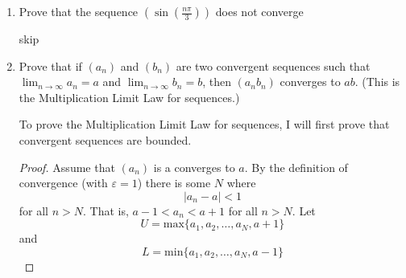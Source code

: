 \documentclass[11pt]{exam}
\begin{document}
    \begin{enumerate}
        \item Prove that the sequence $(\sin(\frac{n\pi}{3}))$ does not converge
            \begin{solution}
                skip
            \end{solution}

        \item Prove that if $(a_n)$ and $(b_n)$ are two convergent sequences such that $\lim_{n \to \infty} a_n = a$ and $\lim_{n \to \infty} b_n = b$, then $(a_nb_n)$ converges to $ab$. (This is the Multiplication Limit Law for
        sequences.)
            \begin{solution}
                To prove the Multiplication Limit Law for
                sequences, I will first prove that convergent sequences are bounded. 
                \begin{proof}
                    Assume that $(a_n)$ is a converges to $a$. By the definition of convergence (with $\varepsilon = 1$) there is some $N$ where 
                    $$|a_n - a| < 1$$
                    for all $n > N$. That is, $a-1 < a_n < a + 1$ for all $n > N$. Let 
                    $$ U = \text{max}\{a_1, a_2, \ldots , a_N, a + 1\}$$ and 
                    $$ L = \text{min}\{a_1, a_2, \ldots , a_N, a - 1\}$$


\end{proof}
\end{solution}
\end{enumerate}
\end{document}
